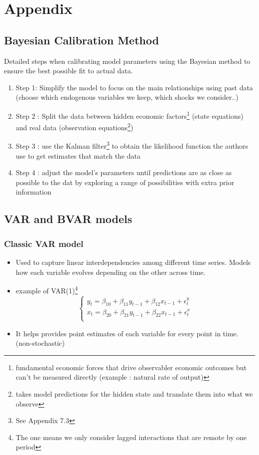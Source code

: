 \documentclass{article}
\begin{document}
\section{Appendix}

\subsection{Bayesian Calibration Method}
Detailed steps when calibrating model parameters using the Bayesian method to ensure the best possible fit to actual data. 
\begin{enumerate}
    \item Step 1: Simplify the model to focus on the main relationships using past data (choose which endogenous variables we keep, which shocks we consider..)
    \item Step 2 : Split the data between hidden economic factors\footnote{fundamental economic forces that drive observabler economic outcomes but can't be measured directly (example : natural rate of output)} (state equations) and real data (observation equations\footnote{takes model predictions for the hidden state and translate them into what we observe})
    \item Step 3 : use the Kalman filter\footnote{See Appendix 7.3} to obtain the likelihood function the authors use to get estimates that match the data 
    \item Step 4 : adjust the model's parameters until predictions are as close as possible to the dat by exploring a range of possibilities with extra prior information
\end{enumerate}


\subsection{VAR and BVAR models}
\subsubsection{Classic VAR model}
\begin{itemize}
    \item Used to capture linear interdependencies among different time series. Models how each variable evolves depending on the other across time. 
    \item example of VAR(1)\footnote{The one means we only consider lagged interactions that are remote by one period}
    \begin{equation}
    \left\{
    \begin{aligned}
        y_t = \beta_{10} + \beta_{11}y_{t-1}+\beta_{12}x_{t-1} + \epsilon_t^y\\
        x_t = \beta_{20} + \beta_{21}y_{t-1}+\beta_{22}x_{t-1} + \epsilon_t^x\\
    \end{aligned}
    \right.
    \end{equation}
    \item It helps provides point estimates of each variable for every point in time. (non-stochastic)
\end{itemize}
\end{document}
